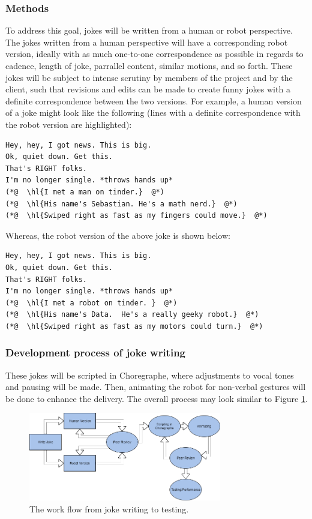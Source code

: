 ﻿\documentclass[onecolumn, draftclsnofoot,10pt, compsoc]{IEEEtran}
\begin{document}
\subsubsection{Methods}
To address this goal, jokes will be written from a human or robot perspective.
The jokes written from a human perspective will have a corresponding robot version, ideally with as much one-to-one correspondence as possible in regards to cadence, length of joke, parrallel content, similar motions, and so forth.
These jokes will be subject to intense scrutiny by members of the project and by the client, such that revisions and edits can be made to create funny jokes with a definite correspondence between the two versions.
For example, a human version of a joke might look like the following (lines with a definite correspondence with the robot version are highlighted):

\begin{lstlisting}
Hey, hey, I got news. This is big.
Ok, quiet down. Get this.
That's RIGHT folks.
I'm no longer single. *throws hands up*
(*@  \hl{I met a man on tinder.}  @*)
(*@  \hl{His name's Sebastian. He's a math nerd.}  @*)
(*@  \hl{Swiped right as fast as my fingers could move.}  @*)
\end{lstlisting}

Whereas, the robot version of the above joke is shown below:

\begin{lstlisting}
Hey, hey, I got news. This is big.
Ok, quiet down. Get this.
That's RIGHT folks.
I'm no longer single. *throws hands up*
(*@  \hl{I met a robot on tinder. }  @*)
(*@  \hl{His name's Data.  He's a really geeky robot.}  @*)
(*@  \hl{Swiped right as fast as my motors could turn.}  @*)
\end{lstlisting}

\subsubsection{Development process of joke writing}
These jokes will be scripted in Choregraphe, where adjustments to vocal tones and pausing will be made.
Then, animating the robot for non-verbal gestures will be done to enhance the delivery.
The overall process may look similar to Figure \ref{fig:write_process}.

\begin{figure}[H]
  \centering
  \includegraphics[width=0.75\textwidth,height=0.75\textheight,keepaspectratio]{joke_writing_process}
  \caption{The work flow from joke writing to testing.}
	\label{fig:write_process}
\end{figure}
\end{document}
